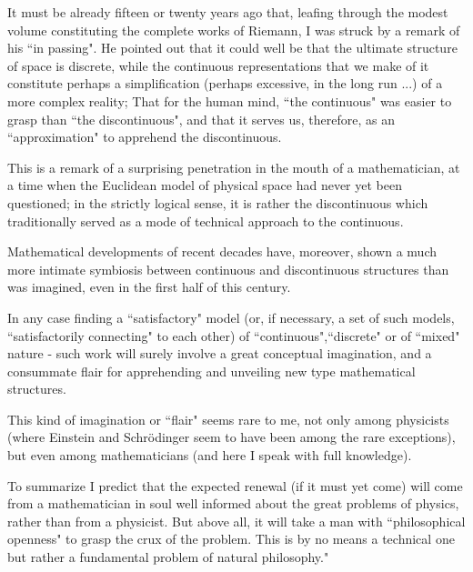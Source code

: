 \documentclass[12pt]{article}
\begin{document}
{\em

It must be already fifteen or twenty years ago that, leafing through the modest volume constituting the complete works
of Riemann, I was struck by a remark of his ``in passing". He pointed out that it could well be that the ultimate structure of space is discrete, while the continuous representations that we
 make of it constitute perhaps a simplification (perhaps excessive, in the long run ...) of a more complex reality; That for the human mind, ``the continuous"  was easier to grasp than ``the discontinuous",  and that it serves us, therefore, as an ``approximation" to apprehend the discontinuous.

This is a remark of a surprising penetration in the mouth of a mathematician, at a time when the Euclidean model of physical space had never yet been questioned; in the strictly logical sense, it is rather the discontinuous which traditionally served as a mode of technical approach to the continuous.

Mathematical developments of recent decades have, moreover, shown a much more intimate symbiosis between continuous and discontinuous structures than was  imagined, even in the first half of this century.

In any case finding a ``satisfactory" model (or, if necessary, a set of such models, ``satisfactorily connecting" to each other) of ``continuous",``discrete" or of ``mixed" nature - such work will surely involve a great conceptual imagination, and a consummate flair for apprehending and unveiling new type mathematical structures.

This kind of imagination or ``flair" seems rare to me, not only among physicists (where Einstein and Schr\"odinger seem to have been among the rare exceptions), but even among mathematicians (and here I speak with full knowledge).

To summarize I predict that the expected renewal (if it must yet  come) will  come from a mathematician in soul well informed about  the great problems of physics, rather than from a physicist. But above all, it will take a man with ``philosophical openness" to grasp the crux of the problem. This is by no means a technical one but rather a fundamental problem of natural philosophy."}
\end{document}
